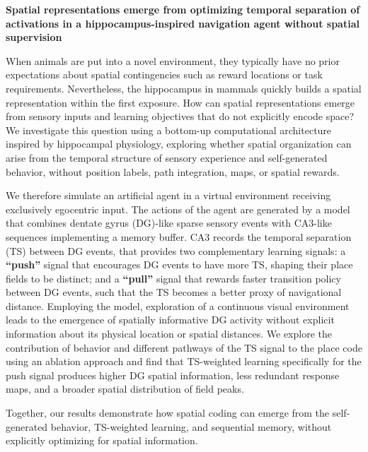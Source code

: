 \documentclass[letterpaper,12pt]{article}
\begin{document}
\begin{center}
{\large\bfseries Spatial representations emerge from optimizing temporal separation of activations in a hippocampus-inspired navigation agent without spatial supervision}\par
\end{center}
\vspace{-5pt}
When animals are put into a novel environment, they typically have no prior expectations about spatial contingencies such as reward locations or task requirements. Nevertheless, the hippocampus in mammals quickly builds a spatial representation within the first exposure.  How can spatial representations emerge from sensory inputs and learning objectives that do not explicitly encode space? We investigate this question using a bottom-up computational architecture inspired by hippocampal physiology, exploring whether spatial organization can arise from the temporal structure of sensory experience and self-generated behavior, without position labels, path integration, maps, or spatial rewards.

We therefore simulate an artificial agent in a virtual environment receiving exclusively egocentric input. The actions of the agent are generated by a model that combines dentate gyrus (DG)-like sparse sensory events with CA3-like sequences implementing a memory buffer. CA3 records the temporal separation (TS) between DG events, that provides two complementary learning signals: a \textbf{``push''} signal that encourages DG events to have more TS, shaping their place fields to be distinct; and a \textbf{``pull''} signal that rewards faster transition policy between DG events, such that the TS becomes a better proxy of navigational distance. Employing the model, exploration of a continuous visual environment leads to the emergence of spatially informative DG activity  without explicit information about its physical location or spatial distances.
We explore the contribution of behavior and different pathways of the TS signal to the place code using an ablation approach and find that TS-weighted learning specifically for the push signal produces higher DG spatial information, less redundant response maps, and a broader spatial distribution of field peaks. 

Together, our results demonstrate how spatial coding can emerge from the self-generated behavior, TS-weighted learning, and sequential memory, without explicitly optimizing for spatial information.
\end{document}
